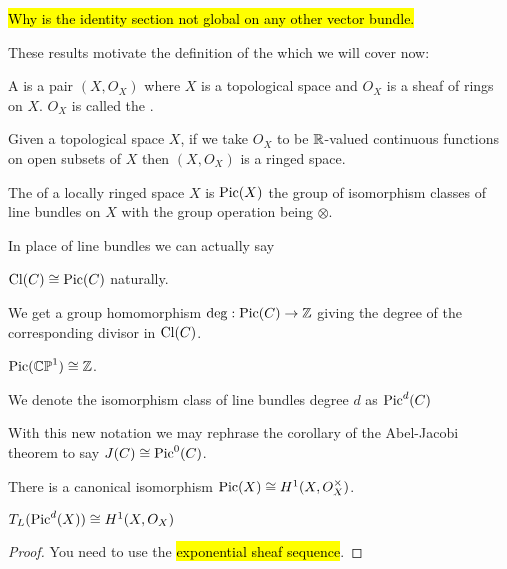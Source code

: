 \documentclass{article}
\begin{document}
\begin{remark}
	\hl{Why is the identity section not global on any other vector bundle.}
\end{remark}

These results motivate the definition of the  which we will cover now:

\begin{definition}
	A  is a pair $(X,O_X)$ where $X$ is a topological space and $O_X$ is a sheaf of rings on $X$. $O_X$ is called the . 
\end{definition}

\begin{example}
	Given a topological space $X$, if we take $O_X$ to be $\mathbb{R}$-valued continuous functions on open subsets of $X$ then $(X,O_X)$ is a ringed space. 
\end{example}

\begin{definition}
	The  of a locally ringed space $X$ is $\operatorname{Pic}(X)$ the group of isomorphism classes of line bundles on $X$ with the group operation being $\otimes$. 
\end{definition}

\begin{remark}
	In place of line bundles we can actually say  
\end{remark}

\begin{theorem}
	$\operatorname{Cl}(C) \cong \operatorname{Pic}(C)$ naturally. 
\end{theorem}
\begin{corollary}
	We get a group homomorphism $\deg:\operatorname{Pic}(C) \to \mathbb{Z}$ giving the degree of the corresponding divisor in $\operatorname{Cl}(C)$. 
\end{corollary}
\begin{corollary}
	$\operatorname{Pic}(\mathbb{CP}^1) \cong \mathbb{Z}$. 
\end{corollary}

\begin{notation}
    We denote the isomorphism class of line bundles degree $d$ as $\operatorname{Pic}^d(C)$
\end{notation}

\begin{remark}
	With this new notation we may rephrase the corollary of the Abel-Jacobi theorem to say $J(C) \cong \operatorname{Pic}^0(C)$. 
\end{remark}

\begin{prop}
	There is a canonical isomorphism $\operatorname{Pic}(X) \cong H^1(X, O_X^\times)$. 
\end{prop}
\begin{corollary}
	$T_L(\operatorname{Pic}^d(X)) \cong H^1(X,O_X)$
\end{corollary}
\begin{proof}
	You need to use the \hl{exponential sheaf sequence}. 
\end{proof}
\end{document}
